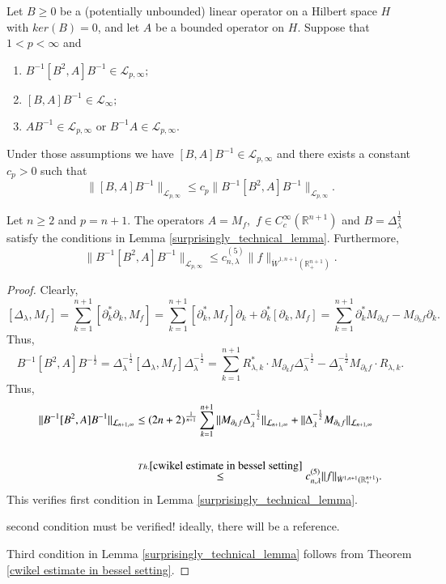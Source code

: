 \documentclass[12pt]{amsart}
\begin{document}
\begin{lemma}\cite[Lemma 4.4]{MR4654013}\label{surprisingly_technical_lemma}
Let $B\geq 0$ be a (potentially unbounded) linear operator on a Hilbert space $H$ with $ker(B)=0$, and let $A$ be a bounded operator on $H$. Suppose that $1<p<\infty$ and
\begin{enumerate}[{\rm (i)}]
\item $B^{-1}[B^2,A]B^{-1}\in\mathcal{L}_{p,\infty};$
\item $[B,A]B^{-1}\in\mathcal{L}_{\infty};$
\item $AB^{-1}\in\mathcal{L}_{p,\infty}$ or $B^{-1}A\in\mathcal{L}_{p,\infty}.$
\end{enumerate}
Under those assumptions we have $[B,A]B^{-1} \in \mathcal{L}_{p,\infty}$ and there exists a constant $c_p>0$ such that
$$\|[B,A]B^{-1}\|_{\mathcal{L}_{p,\infty}} \leq c_p\|B^{-1}[B^2,A]B^{-1}\|_{\mathcal{L}_{p,\infty}}.$$
\end{lemma}

\begin{lemma}\label{sufficiency verification lemma} Let $n\geq 2$ and $p=n+1.$ The operators $A=M_f,$ $f\in C^{\infty}_c(\mathbb{R}^{n+1})$ and $B=\Delta_{\lambda}^{\frac12}$ satisfy the conditions in Lemma \ref{surprisingly_technical_lemma}. Furthermore,
$$\|B^{-1}[B^2,A]B^{-1}\|_{\mathcal{L}_{p,\infty}}\leq c_{n,\lambda}^{(5)}\|f\|_{\dot{W}^{1,n+1}(\mathbb{R}^{n+1}_+)}.$$
\end{lemma}
\begin{proof} Clearly,
$$[\Delta_{\lambda},M_f]=\sum_{k=1}^{n+1}[\partial_k^{\ast}\partial_k,M_f]=\sum_{k=1}^{n+1}[\partial_k^{\ast},M_f]\partial_k+\partial_k^{\ast}[\partial_k,M_f]=\sum_{k=1}^{n+1}\partial_k^{\ast}M_{\partial_kf}-M_{\partial_kf}\partial_k.$$
Thus,
$$B^{-1}[B^2,A]B^{-\frac12}=\Delta_\lambda^{-\frac12}[\Delta_{\lambda},M_f]\Delta_\lambda^{-\frac12}=\sum_{k=1}^{n+1}R_{\lambda,k}^{\ast}\cdot M_{\partial_kf}\Delta_{\lambda}^{-\frac12}-\Delta_{\lambda}^{-\frac12}M_{\partial_kf}\cdot R_{\lambda,k}.$$
Thus,
\begin{align*}
\|B^{-1}[B^2,A]B^{-1}\|_{\mathcal{L}_{n+1,\infty}}&\leq (2n+2)^{\frac1{n+1}}\sum_{k=1}^{n+1}\|M_{\partial_kf}\Delta_{\lambda}^{-\frac12}\|_{\mathcal{L}_{n+1,\infty}}+\|\Delta_{\lambda}^{-\frac12}M_{\partial_kf}\|_{\mathcal{L}_{n+1,\infty}}\\
\\&\stackrel{Th.\ref{cwikel estimate in bessel setting}}{\leq} c_{n,\lambda}^{(5)}\|f\|_{\dot{W}^{1,n+1}(\mathbb{R}^{n+1}_+)}.
\end{align*}
This verifies first condition in Lemma \ref{surprisingly_technical_lemma}.
	
{\color{red} second condition must be verified! ideally, there will be a reference.}
	
Third condition in Lemma \ref{surprisingly_technical_lemma} follows from Theorem \ref{cwikel estimate in bessel setting}.
\end{proof}
\end{document}
